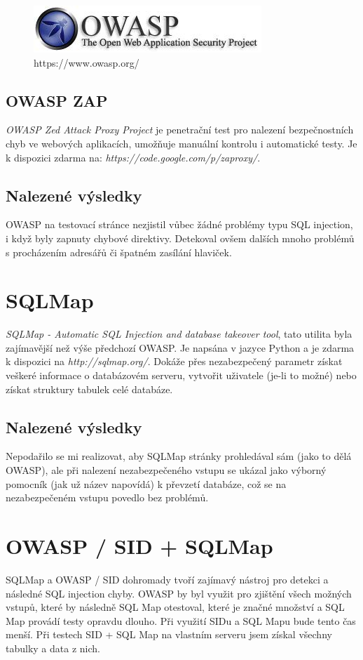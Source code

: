 \documentclass[12pt, a4paper]{report}
\begin{document}
\begin{figure}[h!]
\centerline{\includegraphics[width=325px]{./examples/owasp.jpeg}}
\caption{https://www.owasp.org/}
\label{owasp}
\end{figure}

\subsection{OWASP ZAP}
\textit{OWASP Zed Attack Proxy Project} je penetrační test pro nalezení bezpečnostních chyb ve webových aplikacích, umožňuje manuální kontrolu i automatické testy. Je k dispozici zdarma na: \textit{https://code.google.com/p/zaproxy/}.

\subsection{Nalezené výsledky}
OWASP na testovací stránce nezjistil vůbec žádné problémy typu SQL injection, i když byly zapnuty chybové direktivy. Detekoval ovšem dalších mnoho problémů s procházením adresářů či špatném zasílání hlaviček.

\section{SQLMap}
\textit{SQLMap - Automatic SQL Injection and database takeover tool}, tato utilita byla zajímavější než výše předchozí OWASP. Je napsána v jazyce Python a je zdarma k dispozici na \textit{http://sqlmap.org/}. Dokáže přes nezabezpečený parametr získat veškeré informace o databázovém serveru, vytvořit uživatele (je-li to možné) nebo získat struktury tabulek celé databáze.

\subsection{Nalezené výsledky}
Nepodařilo se mi realizovat, aby SQLMap stránky prohledával sám (jako to dělá OWASP), ale při nalezení nezabezpečeného vstupu se ukázal jako výborný pomocník (jak už název napovídá) k převzetí databáze, což se na nezabezpečeném vstupu povedlo bez problémů.

\section{OWASP / SID + SQLMap}
SQLMap a OWASP / SID dohromady tvoří zajímavý nástroj pro detekci a následné  SQL injection chyby. OWASP by byl využit pro zjištění všech možných vstupů, které by následně SQL Map otestoval, které je značné množství a SQL Map provádí testy opravdu dlouho. Při využití SIDu a SQL Mapu bude tento čas menší. Při testech SID + SQL Map na vlastním serveru jsem získal všechny tabulky a data z nich.
\end{document}
